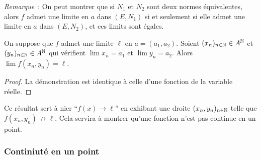 \emph{Remarque}~: On peut montrer que si $N_1$ et $N_2$ sont deux normes équivalentes, alors $f$ admet une limite en $a$ dans $(E, N_1)$ si et seulement si elle admet une limite en $a$ dans $(E, N_2)$, et ces limits sont égales.

\begin{prop}
  On suppose que $f$ admet une limite $\ell$ en $a=(a_1, a_2)$. Soient $(x_n)_{n \in \mathbb{N}}\in A^{\mathbb{N}}$ et $(y_n)_{n \in \mathbb{N}}\in A^{\mathbb{N}}$ qui vérifient $\lim x_n=a_1$ et $\lim y_n=a_2$. Alors $\lim f(x_n, y_n)=\ell$.
\end{prop}
\begin{proof}
  La démonstration est identique à celle d'une fonction de la variable réelle.
\end{proof}

Ce résultat sert à nier ``$f(x) \to \ell$'' en exhibant une droite $(x_n, y_n)_{n \in \mathbb{N}}$ telle que $f(x_n, y_n) \not\to \ell$. Cela servira à montrer qu'une fonction n'est pas continue en un point.

\subsubsection{Continiuté en un point}

